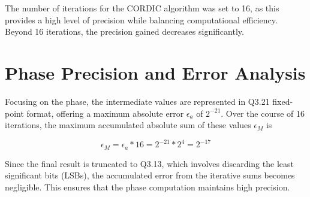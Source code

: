 The number of iterations for the CORDIC algorithm was set to 16, as this provides a high level of precision while balancing computational efficiency. Beyond 16 iterations, the precision gained decreases significantly.



\section{Phase Precision and Error Analysis}
Focusing on the phase, the intermediate values are represented in Q3.21 fixed-point format, offering a maximum absolute error \( \epsilon_a \) of \(2^{-21}\). Over the course of 16 iterations, the maximum accumulated absolute sum of these values \( \epsilon_M \) is

\[
    \epsilon_M = \epsilon_a * 16 = 2^{-21} * 2^{4} = 2^{-17}
\]

Since the final result is truncated to Q3.13, which involves discarding the least significant bits (LSBs), the accumulated error from the iterative sums becomes negligible. This ensures that the phase computation maintains high precision.